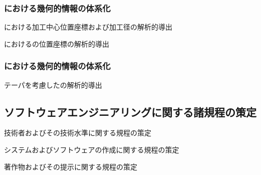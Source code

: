 \subsubsection{\CurvedOutcutMilling における幾何的情報の体系化}
\begin{enumerate}[label={\sarrow[red]}]
\item[\sarrow] \CurvedOutcut における加工中心位置座標および加工径の解析的導出
\item[\sarrow] \CurvedOutcut における\EndFace の位置座標の解析的導出
\end{enumerate}

\subsubsection{\InnerDiameter における幾何的情報の体系化}
\begin{enumerate}[label={\sarrow[red]}]
\item[\sarrow] テーパを考慮した\InnerDiameter の解析的導出
\end{enumerate}



\clearpage


\subsection{ソフトウェアエンジニアリングに関する諸規程の策定}
\begin{enumerate}[label={\sarrow[red]}]
\item 技術者およびその技術水準に関する規程の策定
\item システムおよびソフトウェアの作成に関する規程の策定
\item {}著作物およびその提示に関する規程の策定
\end{enumerate}



